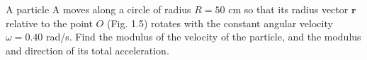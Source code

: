 
\item A particle A moves along a circle of radius \( R = 50 \) cm so that its radius vector \( \mathbf{r} \) relative to the point \( O \) (Fig. 1.5) rotates with the constant angular velocity \( \omega = 0.40 \) rad/s. Find the modulus of the velocity of the particle, and the modulus and direction of its total acceleration.
    \begin{center}
    \end{center}
